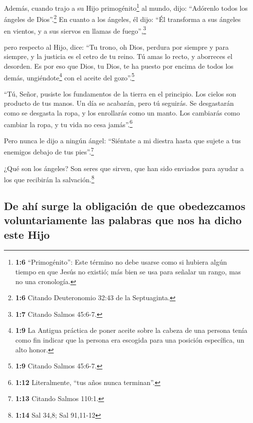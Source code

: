  Además, cuando trajo a su Hijo primogénito\footnote{\textbf{1:6}
  ``Primogénito'': Este término no debe usarse como si hubiera algún
  tiempo en que Jesús no existió; más bien se usa para señalar un rango,
  mas no una cronología.} al mundo, dijo: ``Adórenlo todos los ángeles
de Dios''.\footnote{\textbf{1:6} Citando Deuteronomio 32:43 de la
  Septuaginta.}  En cuanto a los ángeles, él dijo: ``Él
transforma a sus ángeles en vientos, y a sus siervos en llamas de
fuego'',\footnote{\textbf{1:7} Citando Salmos 45:6-7.}

 pero respecto al Hijo, dice: ``Tu trono, oh Dios, perdura
por siempre y para siempre, y la justicia es el cetro de tu reino.
 Tú amas lo recto, y aborreces el desorden. Es por eso que
Dios, tu Dios, te ha puesto por encima de todos los demás,
ungiéndote\footnote{\textbf{1:9} La Antigua práctica de poner aceite
  sobre la cabeza de una persona tenía como fin indicar que la persona
  era escogida para una posición específica, un alto honor.} con el
aceite del gozo''.\footnote{\textbf{1:9} Citando Salmos 45:6-7.}

 ``Tú, Señor, pusiste los fundamentos de la tierra en el
principio. Los cielos son producto de tus manos.  Un día
se acabarán, pero tú seguirás. Se desgastarán como se desgasta la ropa,
 y los enrollarás como un manto. Los cambiarás como
cambiar la ropa, y tu vida no cesa jamás''.\footnote{\textbf{1:12}
  Literalmente, ``tus años nunca terminan''.}

 Pero nunca le dijo a ningún ángel: ``Siéntate a mi
diestra hasta que sujete a tus enemigos debajo de tus pies''.\footnote{\textbf{1:13}
  Citando Salmos 110:1.}

 ¿Qué son los ángeles? Son seres que sirven, que han sido
enviados para ayudar a los que recibirán la salvación.\footnote{\textbf{1:14}
  Sal 34,8; Sal 91,11-12}

\hypertarget{de-ahuxed-surge-la-obligaciuxf3n-de-que-obedezcamos-voluntariamente-las-palabras-que-nos-ha-dicho-este-hijo}{%
\subsection{De ahí surge la obligación de que obedezcamos
voluntariamente las palabras que nos ha dicho este
Hijo}\label{de-ahuxed-surge-la-obligaciuxf3n-de-que-obedezcamos-voluntariamente-las-palabras-que-nos-ha-dicho-este-hijo}}

